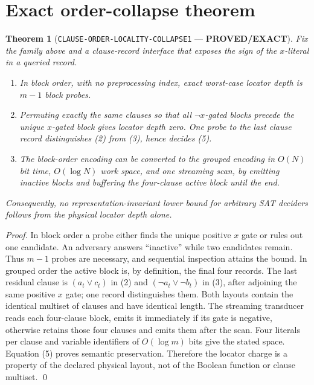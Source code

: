 \documentclass[11pt]{article}
\newcommand{\EXACT}{\textbf{PROVED/EXACT}}
\newtheorem{theorem}{Theorem}
\begin{document}
\section{Exact order-collapse theorem}

\begin{theorem}[\texttt{CLAUSE-ORDER-LOCALITY-COLLAPSE1} --- \EXACT]
Fix the family above and a clause-record interface that exposes the sign of
the $x$-literal in a queried record.
\begin{enumerate}[leftmargin=1.7em]
\item In block order, with no preprocessing index, exact worst-case locator
depth is $m-1$ block probes.
\item Permuting exactly the same clauses so that all $\neg x$-gated blocks
precede the unique $x$-gated block gives locator depth zero.  One probe to the
last clause record distinguishes (2) from (3), hence decides (5).
\item The block-order encoding can be converted to the grouped encoding in
$O(N)$ bit time, $O(\log N)$ work space, and one streaming scan, by emitting
inactive blocks and buffering the four-clause active block until the end.
\end{enumerate}
Consequently, no representation-invariant lower bound for arbitrary SAT
deciders follows from the physical locator depth alone.
\end{theorem}

\begin{proof}
In block order a probe either finds the unique positive $x$ gate or rules out
one candidate.  An adversary answers ``inactive'' while two candidates
remain.  Thus $m-1$ probes are necessary, and sequential inspection attains
the bound.  In grouped order the active block is, by definition, the final
four records.  The last residual clause is $(a_t\vee c_t)$ in (2) and
$(\neg a_t\vee\neg b_t)$ in (3), after adjoining the same positive $x$ gate;
one record distinguishes them.  Both layouts contain the identical multiset
of clauses and have identical length.  The streaming transducer reads each
four-clause block, emits it immediately if its gate is negative, otherwise
retains those four clauses and emits them after the scan.  Four literals per
clause and variable identifiers of $O(\log m)$ bits give the stated space.
Equation (5) proves semantic preservation.  Therefore the locator charge is
a property of the declared physical layout, not of the Boolean function or
clause multiset. \qed
\end{proof}
\end{document}
